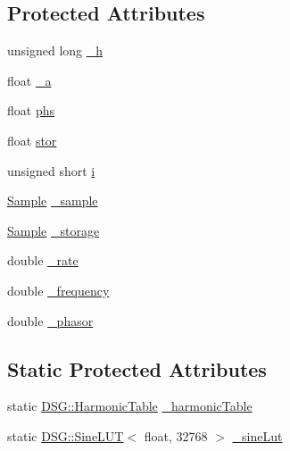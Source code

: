 \subsection*{Protected Attributes}
\begin{DoxyCompactItemize}
\item 
unsigned long \hyperlink{classDSG_1_1FourierTriangle_a855d5d0d221588639f079f463cd2141d}{\+\_\+h}
\item 
float \hyperlink{classDSG_1_1FourierTriangle_ae6dfba2bc41db7ae4715abcdb0757787}{\+\_\+a}
\item 
float \hyperlink{classDSG_1_1FourierTriangle_a6a934e1f4271a9b4984fef83a51a0d74}{phs}
\item 
float \hyperlink{classDSG_1_1FourierTriangle_af34da414548a924ff49e49e4ba6353d4}{stor}
\item 
unsigned short \hyperlink{classDSG_1_1FourierTriangle_a5e5749c6efba1470dfd136b50176d249}{i}
\item 
\hyperlink{classDSG_1_1Sample}{Sample} \hyperlink{classDSG_1_1FourierGenerator_ab96bed1cd59c42e82a689036e5c62bef}{\+\_\+sample}
\item 
\hyperlink{classDSG_1_1Sample}{Sample} \hyperlink{classDSG_1_1FourierGenerator_a6b7f2439b26914cc9df6b6975a2cedac}{\+\_\+storage}
\item 
double \hyperlink{classDSG_1_1SignalGenerator_aa10f6c85d9adee901139ea7fb346f39d}{\+\_\+rate}
\item 
double \hyperlink{classDSG_1_1SignalGenerator_a67e296e3506dcdf09402c667cddff9ac}{\+\_\+frequency}
\item 
double \hyperlink{classDSG_1_1SignalGenerator_ac2271b582bf699275f077ecb642a8cd9}{\+\_\+phasor}
\end{DoxyCompactItemize}
\subsection*{Static Protected Attributes}
\begin{DoxyCompactItemize}
\item 
static \hyperlink{classDSG_1_1HarmonicTable}{D\+S\+G\+::\+Harmonic\+Table} \hyperlink{classDSG_1_1FourierGenerator_a7288408f8e44d5edb5eecc62480243d7}{\+\_\+harmonic\+Table}
\item 
static \hyperlink{classDSG_1_1SineLUT}{D\+S\+G\+::\+Sine\+L\+U\+T}$<$ float, 32768 $>$ \hyperlink{classDSG_1_1FourierGenerator_a1ae5fb243ce05e638bdf0dec8bde7426}{\+\_\+sine\+Lut}
\end{DoxyCompactItemize}


